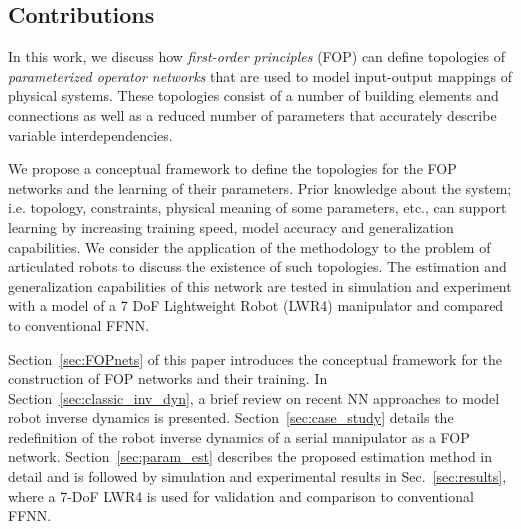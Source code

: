 \subsection{Contributions}

In this work, we discuss how \emph{first-order principles} (FOP) can define topologies of \emph{parameterized operator networks} that are used to model input-output mappings of physical systems. These topologies consist of a number of building elements and connections as well as a reduced number of parameters that accurately describe variable interdependencies. 

We propose a conceptual framework to define the topologies for the FOP networks and the learning of their parameters. Prior knowledge about the system; i.e. topology, constraints, physical meaning of some parameters, etc., can support learning by increasing training speed, model accuracy and generalization capabilities. We consider the application of the methodology to the problem of articulated robots to discuss the existence of such topologies. The estimation and generalization capabilities of this network are tested in simulation and experiment with a model of a 7 DoF Lightweight Robot (LWR4) manipulator and compared to conventional FFNN.

Section~\ref{sec:FOPnets} of this paper introduces the conceptual framework for the construction of FOP networks and their training. In Section~\ref{sec:classic_inv_dyn}, a brief review on recent NN approaches to model robot inverse dynamics is presented. Section~\ref{sec:case_study} details the redefinition of the robot inverse dynamics of a serial manipulator as a FOP network. Section~\ref{sec:param_est} describes the proposed estimation method in detail and is followed by simulation and experimental results in Sec.~\ref{sec:results}, where a 7-DoF LWR4 is used for validation and comparison to conventional FFNN.


